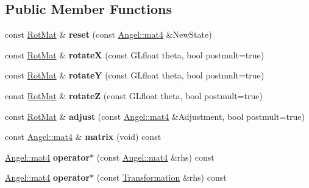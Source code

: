 \subsection*{Public Member Functions}
\begin{DoxyCompactItemize}
\item 
\hypertarget{class_rot_mat_a32b794d5158a61eccc2f9d7b06ab3fb5}{const \hyperlink{class_rot_mat}{Rot\-Mat} \& {\bfseries reset} (const \hyperlink{class_angel_1_1mat4}{Angel\-::mat4} \&New\-State)}\label{class_rot_mat_a32b794d5158a61eccc2f9d7b06ab3fb5}

\item 
\hypertarget{class_rot_mat_a15dbc3c6e4870662413e6998ad391191}{const \hyperlink{class_rot_mat}{Rot\-Mat} \& {\bfseries rotate\-X} (const G\-Lfloat theta, bool postmult=true)}\label{class_rot_mat_a15dbc3c6e4870662413e6998ad391191}

\item 
\hypertarget{class_rot_mat_ae1c4ec7d057458bf96ca94cd164617b8}{const \hyperlink{class_rot_mat}{Rot\-Mat} \& {\bfseries rotate\-Y} (const G\-Lfloat theta, bool postmult=true)}\label{class_rot_mat_ae1c4ec7d057458bf96ca94cd164617b8}

\item 
\hypertarget{class_rot_mat_a60364401770d127c040cc3ed1ad83c07}{const \hyperlink{class_rot_mat}{Rot\-Mat} \& {\bfseries rotate\-Z} (const G\-Lfloat theta, bool postmult=true)}\label{class_rot_mat_a60364401770d127c040cc3ed1ad83c07}

\item 
\hypertarget{class_rot_mat_ae37469da848ee4b633889f44babde9fe}{const \hyperlink{class_rot_mat}{Rot\-Mat} \& {\bfseries adjust} (const \hyperlink{class_angel_1_1mat4}{Angel\-::mat4} \&Adjustment, bool postmult=true)}\label{class_rot_mat_ae37469da848ee4b633889f44babde9fe}

\item 
\hypertarget{class_transformation_afcec300424207fc1d20864b73136937e}{const \hyperlink{class_angel_1_1mat4}{Angel\-::mat4} \& {\bfseries matrix} (void) const }\label{class_transformation_afcec300424207fc1d20864b73136937e}

\item 
\hypertarget{class_transformation_afdfbf48815a5b0d885f3b93f04cd2c66}{\hyperlink{class_angel_1_1mat4}{Angel\-::mat4} {\bfseries operator$\ast$} (const \hyperlink{class_angel_1_1mat4}{Angel\-::mat4} \&rhs) const }\label{class_transformation_afdfbf48815a5b0d885f3b93f04cd2c66}

\item 
\hypertarget{class_transformation_a85b923e0066365ef2e4aec3671396410}{\hyperlink{class_angel_1_1mat4}{Angel\-::mat4} {\bfseries operator$\ast$} (const \hyperlink{class_transformation}{Transformation} \&rhs) const }\label{class_transformation_a85b923e0066365ef2e4aec3671396410}

\end{DoxyCompactItemize}
